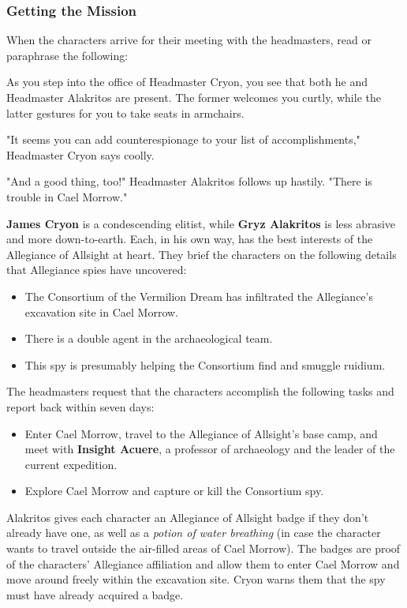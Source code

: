 \documentclass[10pt,a4paper,twoside,bg=print,twocolumn,openany,nodeprecatedcode]{dndbook}
\begin{document}
\subsubsection{Getting the Mission}
When the characters arrive for their meeting with the headmasters, read or paraphrase the following:

\begin{DndReadAloud}{}
As you step into the office of Headmaster Cryon, you see that both he and Headmaster Alakritos are present. The former welcomes you curtly, while the latter gestures for you to take seats in armchairs.

"It seems you can add counterespionage to your list of accomplishments," Headmaster Cryon says coolly.

"And a good thing, too!" Headmaster Alakritos follows up hastily. "There is trouble in Cael Morrow."

\end{DndReadAloud}

\textbf{James Cryon} is a condescending elitist, while \textbf{Gryz Alakritos} is less abrasive and more down-to-earth. Each, in his own way, has the best interests of the Allegiance of Allsight at heart. They brief the characters on the following details that Allegiance spies have uncovered:


\begin{itemize}
\item The Consortium of the Vermilion Dream has infiltrated the Allegiance's excavation site in Cael Morrow.
\item There is a double agent in the archaeological team.
\item This spy is presumably helping the Consortium find and smuggle ruidium.
\end{itemize}

The headmasters request that the characters accomplish the following tasks and report back within seven days:


\begin{itemize}
\item Enter Cael Morrow, travel to the Allegiance of Allsight's base camp, and meet with \textbf{Insight Acuere}, a professor of archaeology and the leader of the current expedition.
\item Explore Cael Morrow and capture or kill the Consortium spy.
\end{itemize}

Alakritos gives each character an Allegiance of Allsight badge if they don't already have one, as well as a \textit{potion of water breathing} (in case the character wants to travel outside the air-filled areas of Cael Morrow). The badges are proof of the characters' Allegiance affiliation and allow them to enter Cael Morrow and move around freely within the excavation site. Cryon warns them that the spy must have already acquired a badge.
\end{document}
